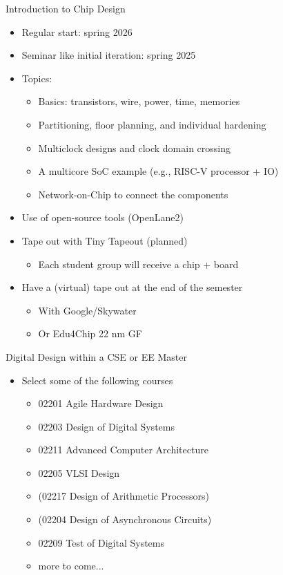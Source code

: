 \begin{frame}[fragile]{Introduction to Chip Design}
\begin{itemize}
\item Regular start: spring 2026
\item Seminar like initial iteration: spring 2025
\item Topics:
\begin{itemize}
\item Basics: transistors, wire, power, time, memories
\item Partitioning, floor planning, and individual hardening
\item Multiclock designs and clock domain crossing
\item A multicore SoC example (e.g., RISC-V processor + IO)
\item Network-on-Chip to connect the components
\end{itemize}
\item Use of open-source tools (OpenLane2)
\item Tape out with Tiny Tapeout (planned)
\begin{itemize}
\item Each student group will receive a chip + board
\end{itemize}
\item Have a (virtual) tape out at the end of the semester
\begin{itemize}
\item With Google/Skywater
\item Or Edu4Chip 22 nm GF
\end{itemize}
\end{itemize}
\end{frame}

\begin{frame}[fragile]{Digital Design within a CSE or EE Master}
\begin{itemize}
\item Select some of the following courses
\begin{itemize}
\item 02201 Agile Hardware Design 
\item 02203 Design of Digital Systems
\item 02211 Advanced Computer Architecture
\item 02205 VLSI Design
\item (02217 Design of Arithmetic Processors)
\item (02204 Design of Asynchronous Circuits)
\item 02209 Test of Digital Systems
\item more to come...
\end{itemize}
\end{itemize}
\end{frame}

